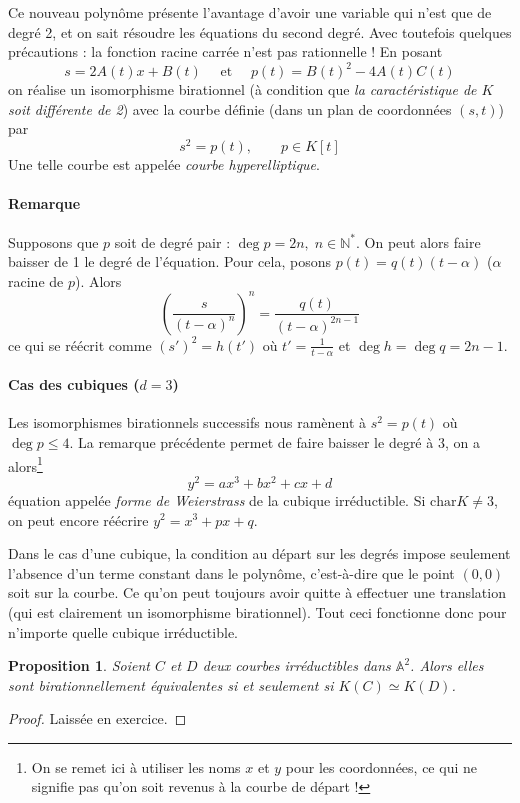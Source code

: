 \documentclass[a4paper, 11pt]{article}
\newtheorem{proposition}[théorème]{Proposition}
\theoremstyle{definition}
\newcommand{\nat}{\mathbb{N}}
\newcommand{\aff}{\mathbb{A}}
\newcommand{\carac}{\textrm{char}}
\begin{document}
Ce nouveau polynôme présente l'avantage d'avoir une variable qui n'est
que de degré 2, et on sait résoudre les équations du second
degré. Avec toutefois quelques précautions : la fonction racine carrée
n'est pas rationnelle ! En posant
\[ s = 2A(t)x + B(t) \quad\text{ et }\quad p(t) = B(t)^2 -
4A(t)C(t) \]
on réalise un isomorphisme birationnel (à condition que \emph{la
  caractéristique de $K$ soit différente de 2}) avec la courbe définie
(dans un plan de coordonnées $(s,t)$) par
\[ s^2 = p(t), \qquad p \in K[t] \]
Une telle courbe est appelée \emph{courbe hyperelliptique}.

\paragraph{Remarque} Supposons que $p$ soit de degré pair :
$\deg p = 2n,\; n \in \nat^*$. On peut alors faire baisser de 1 le degré
de l'équation. Pour cela, posons $p(t) = q(t)(t-\alpha)$ ($\alpha$
racine de $p$). Alors
\[ \left(\frac{s}{(t-\alpha)^n}\right)^n =
\frac{q(t)}{(t-\alpha)^{2n-1}} \]
ce qui se réécrit comme $(s')^2 = h(t')$ où $t' = \frac{1}{t-\alpha}$ et
$\deg h = \deg q = 2n-1$.

\paragraph{Cas des cubiques ($d=3$)} Les isomorphismes birationnels
successifs nous ramènent à $s^2 = p(t)$ où $\deg p \leq 4$. La
remarque précédente permet de faire baisser le degré à 3, on a
alors\footnote{On se remet ici à utiliser les noms $x$ et $y$ pour les
  coordonnées, ce qui ne signifie pas qu'on soit revenus à la courbe
  de départ !}
\[ y^2 = ax^3 + bx^2 + cx + d \]
équation appelée \emph{forme de Weierstrass} de la cubique
irréductible. Si $\carac K \neq 3$, on peut encore réécrire
$y^2 = x^3 + px + q$.

Dans le cas d'une cubique, la condition au départ sur les degrés
impose seulement l'absence d'un terme constant dans le polynôme,
c'est-à-dire que le point $(0,0)$ soit sur la courbe. Ce qu'on peut
toujours avoir quitte à effectuer une translation (qui est clairement
un isomorphisme birationnel). Tout ceci fonctionne donc pour n'importe
quelle cubique irréductible.

\begin{proposition}
  Soient $C$ et $D$ deux courbes irréductibles dans $\aff^2$. Alors
  elles sont birationnellement équivalentes si et seulement si
  $K(C) \simeq K(D)$.
\end{proposition}
\begin{proof}
  Laissée en exercice.
\end{proof}
\end{document}

